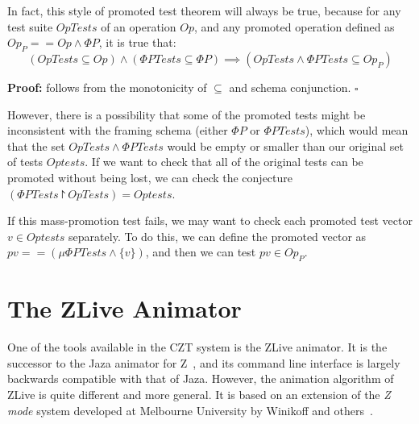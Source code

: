\documentclass{llncs}
\let\QED=\square
\begin{document}
In fact, this style of promoted test theorem will always be true,
because for any test suite $OpTests$ of an operation $Op$,
and any promoted operation defined as $Op_P == Op \land \Phi P$,
it is true that:
\[
   (OpTests \subseteq Op) \land (\Phi PTests \subseteq \Phi P)
   \implies (OpTests \land \Phi PTests \subseteq Op_P)
\]

\textbf{Proof:} follows from the monotonicity of $\subseteq$ and schema
conjunction. $\QED$

However, there is a possibility that some of the promoted tests
might be inconsistent with the framing schema (either $\Phi P$ or $\Phi
PTests$), which would mean that the set $OpTests \land \Phi PTests$
would be empty or smaller than our original set of tests $Optests$.
If we want to check that all of the original tests can be promoted without
being lost, we can check the conjecture
$(\Phi PTests \project OpTests) = Optests$.

If this mass-promotion test fails, we may want to check each promoted test
vector $v \in Optests$ separately.  To do this, we can define the promoted
vector as $pv == (\mu \Phi PTests \land \{v\})$, and then we can test
$pv \in Op_P$.


\section{The ZLive Animator}\label{sect:zlive}

One of the tools available in the CZT system is the ZLive animator.
It is the successor to the Jaza animator for Z~\cite{utting:jaza},
and its command line interface is largely backwards compatible with that of
Jaza.  However, the animation algorithm of ZLive is quite different and
more general.  It is based on an extension of the \emph{Z mode} system
developed at Melbourne University by Winikoff and
others~\cite{kazmierczak:animation98,winikoff:modes-subtypes98}.
\end{document}
